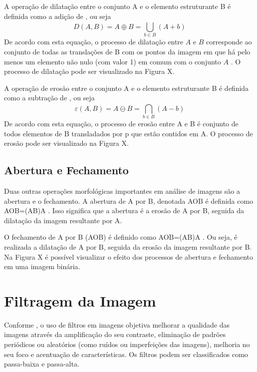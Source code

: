 \documentclass[12pt,oneside,a4paper,english,french,spanish,brazil,]{abntex2}
\begin{document}
A operação de dilatação entre o conjunto A e o elemento estruturante B é definida como a adição de \citet{minkowski:1911}, ou seja \[D(A,B)=A\oplus B=\bigcup_{b\in B}^{ } (A+b)\]De acordo com esta equação, o processo de dilatação entre \(A\) e \(B\) corresponde ao conjunto de todas as translações de B com os pontos da imagem em que há pelo menos um elemento não nulo (com valor 1) em comum com o conjunto \(A\) \cite{pedrini:2008}. O processo de dilatação pode ser visualizado na Figura X.


A operação de erosão entre o conjunto A e o elemento estruturante B é definida como a subtração de \citet{minkowski:1911}, ou seja \[\varepsilon(A,B)=A\ominus B=\bigcap_{b\in B}^{ } (A-b)\]De acordo com esta equação, o processo de erosão entre A e B é conjunto de todos elementos de B transladados por p que estão contidos em A. O processo de erosão pode ser visualizado na Figura X.


\subsection{Abertura e Fechamento}

Duas outras operações morfológicas importantes em análise de imagens são a abertura e o fechamento. A abertura de A por B, denotada AOB é definida como AOB=(AB)A \cite{pedrini:2008}. Isso significa que a abertura é a erosão de A por B, seguida da dilatação da imagem resultante por A.

O fechamento de A por B (AOB) é definido como AOB=(AB)A \cite{pedrini:2008}. Ou seja, é realizada a dilatação de A por B, seguida da erosão da imagem resultante por B.
Na Figura X é possível visualizar o efeito dos processos de abertura e fechamento em uma imagem binária.


\section{Filtragem da Imagem}

Conforme \citet{conci:2003}, o uso de filtros em imagens objetiva melhorar a qualidade das imagens através da amplificação do seu contraste, eliminação de padrões periódicos ou aleatórios (como ruídos ou imperfeições das imagens), melhoria no seu foco e acentuação de características. Os filtros podem ser classificados como passa-baixa e passa-alta.
	
\end{document}
